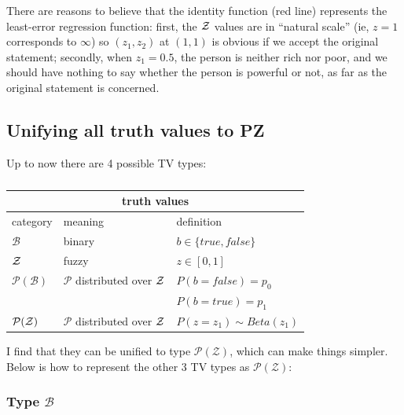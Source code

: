 There are reasons to believe that the identity function (red line) represents the least-error regression function:  first, the $\mathcal{Z}$ values are in ``natural scale'' (ie, $z=1$ corresponds to $\infty$) so $(z_1,z_2)$ at $(1,1)$ is obvious if we accept the original statement;  secondly, when $z_1 = 0.5$, the person is neither rich nor poor, and we should have nothing to say whether the person is powerful or not, as far as the original statement is concerned.

\underconst

\subsection{Unifying all truth values to PZ}
\label{sec:unifying-P(Z)}

Up to now there are 4 possible TV types:
\begin{table}[H]
\parbox{3cm}{\caption{}}
\begin{tabular}{|l|l|l|} \hline
\multicolumn{3}{|c|}{\textbf{truth values}}\\ \hline
category                   & meaning                                      & definition \\ \hline
$\mathcal{B}$              & binary                                       & $b \in \{true, false\} $\\
$\mathcal{Z}$              & fuzzy                                        & $z \in [0,1] $\\
$\mathcal{P}(\mathcal{B})$ & $\mathcal{P}$ distributed over $\mathcal{Z}$ & $ P(b=false) = p_0 $\\
                           &                                              & $ P(b=true) = p_1 $\\
$\mathcal{P}(\mathcal{Z})$ & $\mathcal{P}$ distributed over $\mathcal{Z}$ & $ P(z=z_1) \sim Beta(z_1) $\\ \hline
\end{tabular}
\end{table}
I find that they can be unified to type $\mathcal{P(Z)}$, which can make things simpler.  Below is how to represent the other 3 TV types as $\mathcal{P(Z)}$:

\subsubsection{Type $\mathcal{B}$}

